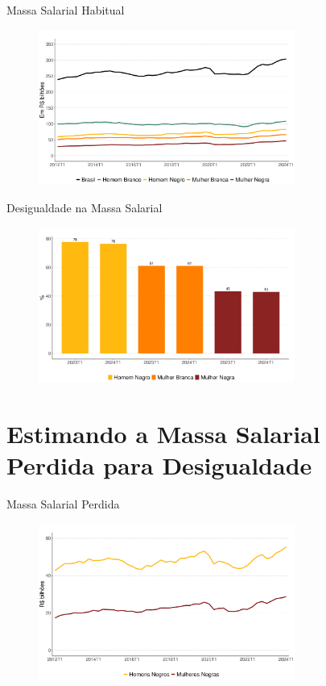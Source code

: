 \documentclass[10pt, xcolor=x11names,compress]{beamer}
\begin{document}
	\begin{frame}{Massa Salarial Habitual}
		\begin{figure}
			\centering
			\includegraphics[width = 0.75\textwidth]{figures_output/massa_habitual_br_gen_raca.pdf}
		\end{figure}
	\end{frame}
	
	\begin{frame}{Desigualdade na Massa Salarial}
		\begin{figure}
			\centering
			\includegraphics[width = 0.75\textwidth]{figures_output/frac_massa_habitual.pdf}
		\end{figure}
	\end{frame}		
	
\section{Estimando a Massa Salarial Perdida para Desigualdade}
	\begin{frame}{Massa Salarial Perdida}
	\begin{figure}
		\centering
		\includegraphics[width = 0.75\textwidth]{figures_output/perda_massa_salarial.pdf}
	\end{figure}
\end{frame}	
\end{document}
